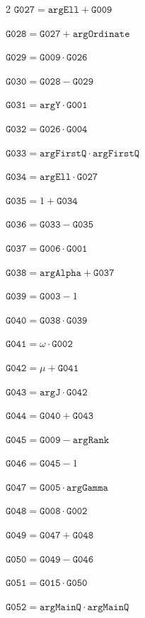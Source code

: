 \documentclass[10pt]{article}
\begin{document}
\begin{multicols}{2}
\noindent $\mathtt{G027}=\mathtt{argEll}+\mathtt{G009}$\par
\noindent $\mathtt{G028}=\mathtt{G027}+\mathtt{argOrdinate}$\par
\noindent $\mathtt{G029}=\mathtt{G009}\cdot \mathtt{G026}$\par
\noindent $\mathtt{G030}=\mathtt{G028}-\mathtt{G029}$\par
\noindent $\mathtt{G031}=\mathtt{argY}\cdot \mathtt{G001}$\par
\noindent $\mathtt{G032}=\mathtt{G026}\cdot \mathtt{G004}$\par
\noindent $\mathtt{G033}=\mathtt{argFirstQ}\cdot \mathtt{argFirstQ}$\par
\noindent $\mathtt{G034}=\mathtt{argEll}\cdot \mathtt{G027}$\par
\noindent $\mathtt{G035}=1+\mathtt{G034}$\par
\noindent $\mathtt{G036}=\mathtt{G033}-\mathtt{G035}$\par
\noindent $\mathtt{G037}=\mathtt{G006}\cdot \mathtt{G001}$\par
\noindent $\mathtt{G038}=\mathtt{argAlpha}+\mathtt{G037}$\par
\noindent $\mathtt{G039}=\mathtt{G003}-1$\par
\noindent $\mathtt{G040}=\mathtt{G038}\cdot \mathtt{G039}$\par
\noindent $\mathtt{G041}=\omega\cdot \mathtt{G002}$\par
\noindent $\mathtt{G042}=\mu+\mathtt{G041}$\par
\noindent $\mathtt{G043}=\mathtt{argJ}\cdot \mathtt{G042}$\par
\noindent $\mathtt{G044}=\mathtt{G040}+\mathtt{G043}$\par
\noindent $\mathtt{G045}=\mathtt{G009}-\mathtt{argRank}$\par
\noindent $\mathtt{G046}=\mathtt{G045}-1$\par
\noindent $\mathtt{G047}=\mathtt{G005}\cdot \mathtt{argGamma}$\par
\noindent $\mathtt{G048}=\mathtt{G008}\cdot \mathtt{G002}$\par
\noindent $\mathtt{G049}=\mathtt{G047}+\mathtt{G048}$\par
\noindent $\mathtt{G050}=\mathtt{G049}-\mathtt{G046}$\par
\noindent $\mathtt{G051}=\mathtt{G015}\cdot \mathtt{G050}$\par
\noindent $\mathtt{G052}=\mathtt{argMainQ}\cdot \mathtt{argMainQ}$\par

\end{multicols}
\end{document}
